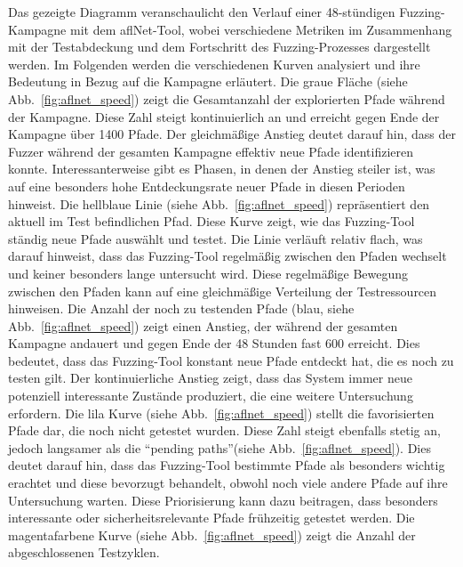 \noindent Das gezeigte Diagramm veranschaulicht den Verlauf einer 48-stündigen Fuzzing-Kampagne mit dem \gls{afl}Net-Tool, wobei
verschiedene Metriken im Zusammenhang mit der Testabdeckung und dem Fortschritt des Fuzzing-Prozesses dargestellt werden.
Im Folgenden werden die verschiedenen Kurven analysiert und ihre Bedeutung in Bezug auf die Kampagne erläutert.\newline\newline
Die graue Fläche (siehe Abb.~\ref{fig:aflnet_speed}) zeigt die Gesamtanzahl der explorierten Pfade während der Kampagne.
Diese Zahl steigt kontinuierlich an und erreicht gegen Ende der Kampagne über 1400 Pfade.
Der gleichmäßige Anstieg deutet darauf hin, dass der Fuzzer während der gesamten Kampagne effektiv neue Pfade
identifizieren konnte.
Interessanterweise gibt es Phasen, in denen der Anstieg steiler ist, was auf eine besonders hohe Entdeckungsrate neuer
Pfade in diesen Perioden hinweist.\newline
Die hellblaue Linie (siehe Abb.~\ref{fig:aflnet_speed}) repräsentiert den aktuell im Test befindlichen Pfad.
Diese Kurve zeigt, wie das Fuzzing-Tool ständig neue Pfade auswählt und testet.
Die Linie verläuft relativ flach, was darauf hinweist, dass das Fuzzing-Tool regelmäßig zwischen den Pfaden wechselt und
keiner besonders lange untersucht wird.
Diese regelmäßige Bewegung zwischen den Pfaden kann auf eine gleichmäßige Verteilung der Testressourcen hinweisen.\newline
Die Anzahl der noch zu testenden Pfade (blau, siehe Abb.~\ref{fig:aflnet_speed}) zeigt einen Anstieg, der während der gesamten Kampagne
andauert und gegen Ende der 48 Stunden fast 600 erreicht.
Dies bedeutet, dass das Fuzzing-Tool konstant neue Pfade entdeckt hat, die es noch zu testen gilt.
Der kontinuierliche Anstieg zeigt, dass das System immer neue potenziell interessante Zustände produziert, die eine
weitere Untersuchung erfordern.\newline
Die lila Kurve (siehe Abb.~\ref{fig:aflnet_speed}) stellt die favorisierten Pfade dar, die noch nicht getestet wurden.
Diese Zahl steigt ebenfalls stetig an, jedoch langsamer als die \enquote{pending paths}(siehe Abb.~\ref{fig:aflnet_speed}).
Dies deutet darauf hin, dass das Fuzzing-Tool bestimmte Pfade als besonders wichtig erachtet und diese bevorzugt behandelt,
obwohl noch viele andere Pfade auf ihre Untersuchung warten.
Diese Priorisierung kann dazu beitragen, dass besonders interessante oder sicherheitsrelevante Pfade frühzeitig getestet werden.
Die magentafarbene Kurve (siehe Abb.~\ref{fig:aflnet_speed}) zeigt die Anzahl der abgeschlossenen Testzyklen.
